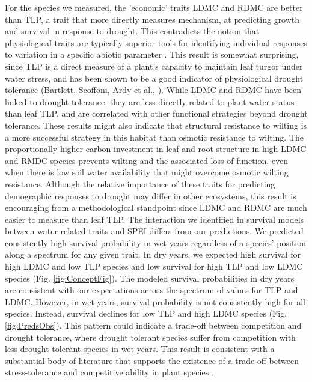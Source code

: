 \documentclass[12pt, letterpaper]{article}
\begin{document}
For the species we measured, the 'economic' traits LDMC and RDMC are better than TLP, a trait that more directly measures mechanism, at predicting growth and survival in response to drought. This contradicts the notion that physiological traits are typically superior tools for identifying individual responses to variation in a specific abiotic parameter \cite{Volaire2018}. This result is somewhat surprising, since TLP is a direct measure of a plant's capacity to maintain leaf turgor under water stress, and has been shown to be a good indicator of physiological drought tolerance (Bartlett, Scoffoni, Ardy et al., ). While LDMC and RDMC have been linked to drought tolerance, they are less directly related to plant water status than leaf TLP, and are correlated with other functional strategies beyond drought tolerance. These results might also indicate that structural resistance to wilting is a more successful strategy in this habitat than osmotic resistance to wilting. The proportionally higher carbon investment in leaf and root structure in high LDMC and RMDC species prevents wilting and the associated loss of function, even when there is low soil water availability that might overcome osmotic wilting resistance. Although the relative importance of these traits for predicting demographic responses to drought may differ in other ecosystems, this result is encouraging from a methodological standpoint since LDMC and RDMC are much easier to measure than leaf TLP.
The interaction we identified in survival models between water-related traits and SPEI differs from our predictions. We predicted consistently high survival probability in wet years regardless of a species’ position along a spectrum for any given trait. In dry years, we expected high survival for high LDMC and low TLP species and low survival for high TLP and low LDMC species (Fig. \ref{fig:ConceptFig}). The modeled survival probabilities in dry years are consistent with our expectations across the spectrum of values for TLP and LDMC. However, in wet years, survival probability is not consistently high for all species. Instead, survival declines for low TLP and high LDMC species (Fig. \ref{fig:PredsObs}). This pattern could indicate a trade-off between competition and drought tolerance, where drought tolerant species suffer from competition with less drought tolerant species in wet years. This result is consistent with a substantial body of literature that supports the existence of a trade-off between stress-tolerance and competitive ability in plant species \cite{Grime1979, Grime1997, Craine2007, Volaire2018}.
\end{document}
